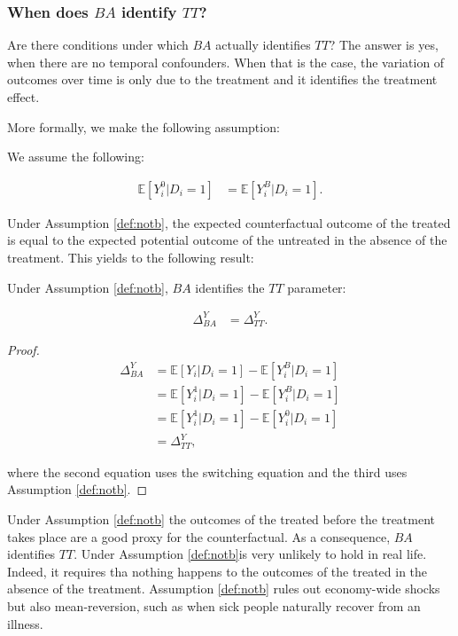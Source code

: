 \documentclass[]{book}
\newcommand{\esp}[1]{\mathbb{E}[ #1 ]}
\theoremstyle{definition}
\theoremstyle{definition}
\theoremstyle{definition}
\theoremstyle{remark}
\let\BeginKnitrBlock\begin \let\EndKnitrBlock\end
\begin{document}
\subsubsection{\texorpdfstring{When does \(BA\) identify
\(TT\)?}{When does BA identify TT?}}\label{when-does-ba-identify-tt}

Are there conditions under which \(BA\) actually identifies \(TT\)? The
answer is yes, when there are no temporal confounders. When that is the
case, the variation of outcomes over time is only due to the treatment
and it identifies the treatment effect.

More formally, we make the following assumption:

\BeginKnitrBlock{definition}[No time trend bias]
\protect\hypertarget{def:notb}{}{\label{def:notb} \iffalse (No time trend
bias) \fi{} }We assume the following:

\begin{align*}
\esp{Y_i^0|D_i=1} & = \esp{Y_i^B|D_i=1}.
\end{align*}
\EndKnitrBlock{definition}

Under Assumption \ref{def:notb}, the expected counterfactual outcome of
the treated is equal to the expected potential outcome of the untreated
in the absence of the treatment. This yields to the following result:

\BeginKnitrBlock{theorem}
\protect\hypertarget{thm:batt}{}{\label{thm:batt} }Under Assumption
\ref{def:notb}, \(BA\) identifies the \(TT\) parameter:

\begin{align*}
\Delta^Y_{BA} & = \Delta^Y_{TT}.
\end{align*}
\EndKnitrBlock{theorem}

\BeginKnitrBlock{proof}
\iffalse{} {Proof. } \fi{}

\begin{align*}
\Delta^Y_{BA} & = \esp{Y_i|D_i=1}-\esp{Y_i^B|D_i=1}\\
              & = \esp{Y_i^1|D_i=1}-\esp{Y_i^B|D_i=1}\\
              & = \esp{Y_i^1|D_i=1}-\esp{Y_i^0|D_i=1} \\
              & = \Delta^Y_{TT},
\end{align*}

where the second equation uses the switching equation and the third uses
Assumption \ref{def:notb}.
\EndKnitrBlock{proof}

Under Assumption \ref{def:notb} the outcomes of the treated before the
treatment takes place are a good proxy for the counterfactual. As a
consequence, \(BA\) identifies \(TT\). Under Assumption \ref{def:notb}is
very unlikely to hold in real life. Indeed, it requires tha nothing
happens to the outcomes of the treated in the absence of the treatment.
Assumption \ref{def:notb} rules out economy-wide shocks but also
mean-reversion, such as when sick people naturally recover from an
illness.
\end{document}
